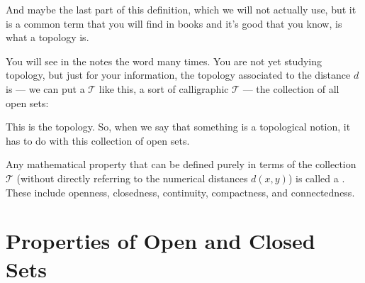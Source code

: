 \begin{speech}[00:10:15 - 00:11:35]
And maybe the last part of this definition, which we will not actually use, but it is a common term that you will find in books and it's good that you know, is what a topology is. 

You will see in the notes the word  many times. You are not yet studying topology, but just for your information, the topology associated to the distance $d$ is --- we can put a $\mathcal{T}$ like this, a sort of calligraphic $\mathcal{T}$ --- the collection of all open sets: 

This is the topology. So, when we say that something is a topological notion, it has to do with this collection of open sets.
\end{speech}

\begin{content}

\begin{steps}
Any mathematical property that can be defined purely in terms of the collection $\mathcal{T}$ (without directly referring to the numerical distances $d(x, y)$) is called a . These include openness, closedness, continuity, compactness, and connectedness.
\end{steps}
\end{content}

\begin{hidden}
\end{hidden}

\section{Properties of Open and Closed Sets}

